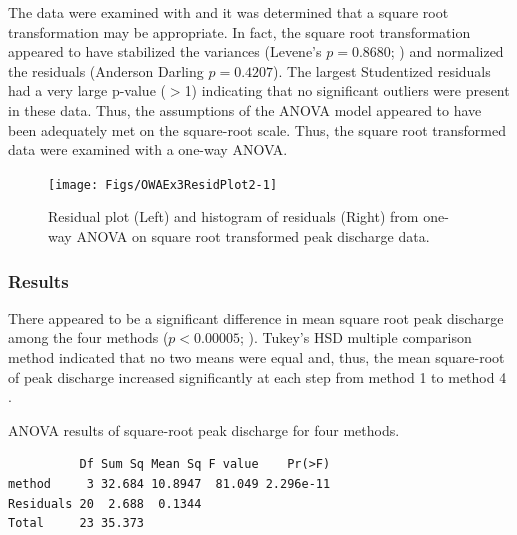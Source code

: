 \documentclass[10pt,openany]{book}\usepackage[]{graphicx}\usepackage[]{color}
\makeatletter
\newenvironment{kframe}{%
 \def\at@end@of@kframe{}%
 \ifinner\ifhmode%
  \def\at@end@of@kframe{\end{minipage}}%
  \begin{minipage}{\columnwidth}%
 \fi\fi%
 \def\FrameCommand##1{\hskip\@totalleftmargin \hskip-\fboxsep
 \colorbox{shadecolor}{##1}\hskip-\fboxsep
     \hskip-\linewidth \hskip-\@totalleftmargin \hskip\columnwidth}%
 \MakeFramed {\advance\hsize-\width
   \@totalleftmargin\z@ \linewidth\hsize
   \@setminipage}}%
 {\par\unskip\endMakeFramed%
 \at@end@of@kframe}
\newenvironment{knitrout}{}{} %
\makeatother
\begin{document}
\vspace{9pt}
The data were examined with  and it was determined that a square root transformation may be appropriate.  In fact, the square root transformation appeared to have stabilized the variances (Levene's $p=0.8680$; ) and normalized the residuals (Anderson Darling $p=0.4207$).  The largest Studentized residuals had a very large p-value ($>$1) indicating that no significant outliers were present in these data.  Thus, the assumptions of the ANOVA model appeared to have been adequately met on the square-root scale.  Thus, the square root transformed data were examined with a one-way ANOVA.

\begin{knitrout}
\color{fgcolor}\begin{figure}[hbtp]

{\centering \texttt{[image: Figs/OWAEx3ResidPlot2-1]} 

}

\caption[Residual plot (Left) and histogram of residuals (Right) from one-way ANOVA on square root transformed peak discharge data]{Residual plot (Left) and histogram of residuals (Right) from one-way ANOVA on square root transformed peak discharge data.}\label{fig:OWAEx3ResidPlot2}
\end{figure}


\end{knitrout}

\subsubsection*{Results}
There appeared to be a significant difference in mean square root peak discharge among the four methods ($p<0.00005$; ).  Tukey's HSD multiple comparison method indicated that no two means were equal  and, thus, the mean square-root of peak discharge increased significantly at each step from method 1 to  method 4 .

\begin{table}[h]
  \centering
  \caption{ANOVA results of square-root peak discharge for four methods.}\label{tab:OWAEx3Results1}
\begin{knitrout}
\color{fgcolor}\begin{kframe}
\begin{verbatim}
          Df Sum Sq Mean Sq F value    Pr(>F)
method     3 32.684 10.8947  81.049 2.296e-11
Residuals 20  2.688  0.1344                  
Total     23 35.373                          
\end{verbatim}
\end{kframe}
\end{knitrout}
\end{table}
\end{document}
